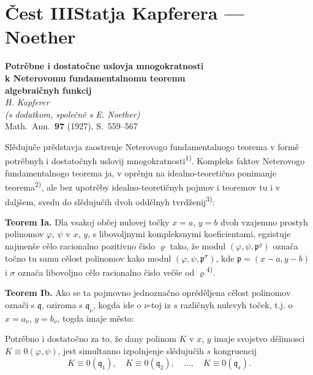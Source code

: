 \documentclass[11pt]{article}
\newcommand{\foreign}[1]{#1}
\theoremstyle{plain}
\begin{document}
\newpage
\part*{Čest III\hspace{1em}Statja Kapferera --- Noether}

\begin{center}
\Large\textbf{Potrěbne i dostatočne uslovja mnogokratnosti}\\[0.3em]
\Large\textbf{k Neterovomu fundamentalnomu teoremu}\\[0.5em]
\large\textbf{algebraičnyh funkcij}\\[1em]
\normalsize\textit{H. Kapferer}\\[0.5em]
\small\textit{(s dodatkom, společně s E. Noether)}\\[1em]
\normalsize \foreign{Math.\ Ann.}\ \textbf{97} (1927), S.~559--567
\end{center}

\vspace{1em}

Slědujuče prědstavja zaostrenje Neterovogo fundamentalnogo
teorema v formě potrěbnyh i dostatočnyh uslovij
mnogokratnosti\textsuperscript{1)}. Kompleks faktov Neterovogo
fundamentalnogo teorema ja, v oprěnju na idealno-teoretično
ponimanje teorema\textsuperscript{2)}, ale bez upotrěby
idealno-teoretičnyh pojmov i teoremov tu i v daljšem, svedu do
slědujučih dvoh oddělnyh tvrdženij\textsuperscript{3)}:

\smallskip
\textbf{Teorem Ia.} Dla vsakoj občej nulovej točky $x = a$,
$y = b$ dvoh vzajemno prostyh polinomov $\varphi$, $\psi$ v $x$, $y$,
s libovoljnymi kompleksnymi koeficientami, egzistuje najmenše cělo
racionalno pozitivno čislo $\varrho$ tako, že modul
$(\varphi, \psi, \mathfrak{p}^{\varrho})$ označa točno tu samu
cělost polinomov kako modul $(\varphi, \psi, \mathfrak{p}^{\sigma})$,
kde $\mathfrak{p} = (x-a, y-b)$ i $\sigma$ označa libovoljno cělo
racionalno čislo večše od $\varrho$\textsuperscript{4)}.

\smallskip
\textbf{Teorem Ib.} Ako se ta pojmovno jednoznačno oprěděljena
cělost polinomov označi s $\mathfrak{q}$, oziroma s
$\mathfrak{q}_{\nu}$, kogda ide o $\nu$-toj iz $s$ različnyh nulevyh
toček, t.j. o $x = a_{\nu}$, $y = b_{\nu}$, togda imaje město:

Potrěbno i dostatočno za to, že dany polinom $K$ v $x$, $y$ imaje
svojstvo dělimosci $K \equiv 0(\varphi, \psi)$, jest simultanno
izpolnjenje slědujučih $s$ kongruencij
\[
K \equiv 0(\mathfrak{q}_{1}), \quad K \equiv 0(\mathfrak{q}_{2}), \quad\ldots,\quad
K \equiv 0(\mathfrak{q}_{s}).
\]
\end{document}
